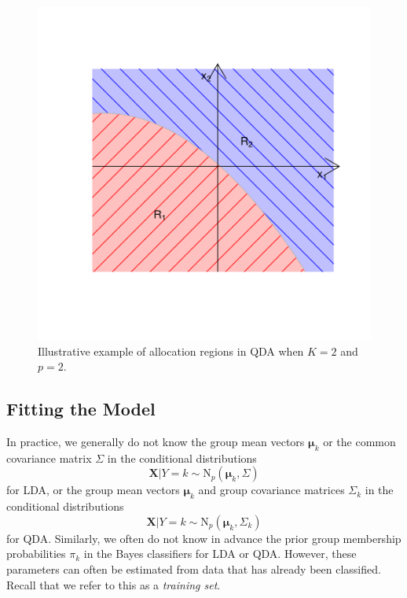 \documentclass[
]{article}
\begin{document}
\begin{figure}[th]

{\centering \includegraphics{QDAillustration-1} 

}

\caption{Illustrative example of allocation regions in QDA when $K=2$ and $p=2$.}\label{fig:QDAillustration}
\end{figure}

\hypertarget{fitting-the-model-1}{%
\subsection{Fitting the Model}\label{fitting-the-model-1}}

In practice, we generally do not know the group mean vectors
\(\boldsymbol{\mu}_k\) or the common covariance matrix \(\Sigma\) in the
conditional distributions \begin{equation*}
\boldsymbol{X} | Y = k \sim \mathrm{N}_p(\boldsymbol{\mu}_k, \Sigma)
\end{equation*} for LDA, or the group mean vectors
\(\boldsymbol{\mu}_k\) and group covariance matrices \(\Sigma_k\) in the
conditional distributions \begin{equation*}
\boldsymbol{X} | Y = k \sim \mathrm{N}_p(\boldsymbol{\mu}_k, \Sigma_k)
\end{equation*} for QDA. Similarly, we often do not know in advance the
prior group membership probabilities \(\pi_k\) in the Bayes classifiers
for LDA or QDA. However, these parameters can often be estimated from
data that has already been classified. Recall that we refer to this as a
\emph{training set}.
\end{document}

